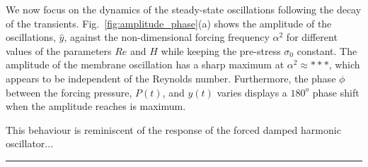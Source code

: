 \documentclass[aps,prl,reprint,superscriptaddress,floatfix]{revtex4-1}
\begin{document}
We now focus on the dynamics of the steady-state oscillations following
the decay of the transients. Fig.~\ref{fig:amplitude_phase}(a) shows the
amplitude of the oscillations, $\widehat{y}$, against the
non-dimensional forcing frequency $\alpha^2$ for different values of the
parameters $Re$ and $H$ while keeping the pre-stress $\sigma_0$ constant.
The amplitude of the membrane oscillation has a sharp maximum at
$\alpha^2 \approx ***$, which appears to be independent of the 
Reynolds number. Furthermore, the phase $\phi$ between the forcing 
pressure, $P(t)$, and $y(t)$ varies displays a $180^{o}$ phase shift 
when the amplitude reaches is maximum.

This behaviour is reminiscent of the response of the forced damped
harmonic oscillator...


\hrule


\newpage
\end{document}
